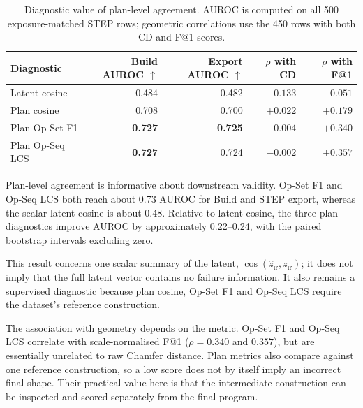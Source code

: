 \documentclass[preprint,12pt]{elsarticle}
\begin{document}
\begin{table}[htbp]
  \centering
  \footnotesize
  \caption{Diagnostic value of plan-level agreement. AUROC is computed on all
    500 exposure-matched STEP rows; geometric correlations use the 450 rows with
    both CD and F@1 scores.}
  \label{tab:plan_diagnostic}
  \begin{tabular}{lrrrr}
    \toprule
    Diagnostic
                    & Build AUROC $\uparrow$
                    & Export AUROC $\uparrow$
                    & $\rho$ with CD
                    & $\rho$ with F@1                                                            \\
    \midrule
    Latent cosine   & 0.484                   & 0.482             & $\mathbf{-0.133}$ & $-0.051$ \\
    Plan cosine     & 0.708                   & 0.700             & $+0.022$          & $+0.179$ \\
    Plan Op-Set F1  & \textbf{0.727}          & \textbf{0.725}
                    & $-0.004$                & $\mathbf{+0.340}$                                \\
    Plan Op-Seq LCS & \textbf{0.727}          & 0.724
                    & $-0.002$                & $\mathbf{+0.357}$                                \\
    \bottomrule
  \end{tabular}
\end{table}

Plan-level agreement is informative about downstream validity. Op-Set F1 and
Op-Seq LCS both reach about 0.73 AUROC for Build and STEP export, whereas the
scalar latent cosine is about 0.48. Relative to latent cosine, the three plan
diagnostics improve AUROC by approximately 0.22--0.24, with the paired
bootstrap intervals excluding zero.

This result concerns one scalar summary of the latent,
$\cos(\hat{z}_{\mathrm{ir}},z_{\mathrm{ir}})$; it does not imply that the full
latent vector contains no failure information. It also remains a supervised
diagnostic because plan cosine, Op-Set F1 and Op-Seq LCS require the dataset's
reference construction.

The association with geometry depends on the metric. Op-Set F1 and Op-Seq LCS
correlate with scale-normalised F@1
($\rho=0.340$ and $0.357$), but are essentially unrelated to raw Chamfer
distance. Plan metrics also compare against one reference construction, so a
low score does not by itself imply an incorrect final shape. Their practical
value here is that the intermediate construction can be inspected and scored
separately from the final program.
\end{document}
